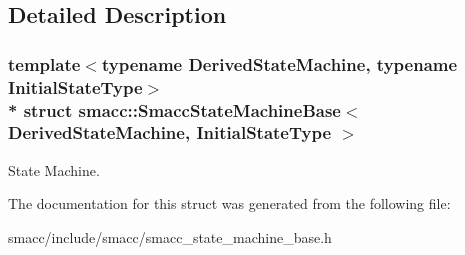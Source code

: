 \subsection{Detailed Description}
\subsubsection*{template$<$typename Derived\+State\+Machine, typename Initial\+State\+Type$>$\\*
struct smacc\+::\+Smacc\+State\+Machine\+Base$<$ Derived\+State\+Machine, Initial\+State\+Type $>$}

State Machine. 

The documentation for this struct was generated from the following file\+:\begin{DoxyCompactItemize}
\item 
smacc/include/smacc/smacc\+\_\+state\+\_\+machine\+\_\+base.\+h\end{DoxyCompactItemize}

